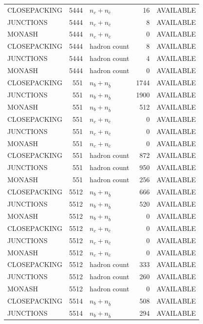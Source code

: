 \begin{landscape}
\begin{longtable}{@{}lrlrl@{}}
CLOSEPACKING & 5444 & $n_c+n_{\bar c}$ & \num{16} & AVAILABLE \\
JUNCTIONS & 5444 & $n_c+n_{\bar c}$ & \num{8} & AVAILABLE \\
MONASH & 5444 & $n_c+n_{\bar c}$ & \num{0} & AVAILABLE \\
CLOSEPACKING & 5444 & hadron count & \num{8} & AVAILABLE \\
JUNCTIONS & 5444 & hadron count & \num{4} & AVAILABLE \\
MONASH & 5444 & hadron count & \num{0} & AVAILABLE \\
CLOSEPACKING & 551 & $n_b+n_{\bar b}$ & \num{1744} & AVAILABLE \\
JUNCTIONS & 551 & $n_b+n_{\bar b}$ & \num{1900} & AVAILABLE \\
MONASH & 551 & $n_b+n_{\bar b}$ & \num{512} & AVAILABLE \\
CLOSEPACKING & 551 & $n_c+n_{\bar c}$ & \num{0} & AVAILABLE \\
JUNCTIONS & 551 & $n_c+n_{\bar c}$ & \num{0} & AVAILABLE \\
MONASH & 551 & $n_c+n_{\bar c}$ & \num{0} & AVAILABLE \\
CLOSEPACKING & 551 & hadron count & \num{872} & AVAILABLE \\
JUNCTIONS & 551 & hadron count & \num{950} & AVAILABLE \\
MONASH & 551 & hadron count & \num{256} & AVAILABLE \\
CLOSEPACKING & 5512 & $n_b+n_{\bar b}$ & \num{666} & AVAILABLE \\
JUNCTIONS & 5512 & $n_b+n_{\bar b}$ & \num{520} & AVAILABLE \\
MONASH & 5512 & $n_b+n_{\bar b}$ & \num{0} & AVAILABLE \\
CLOSEPACKING & 5512 & $n_c+n_{\bar c}$ & \num{0} & AVAILABLE \\
JUNCTIONS & 5512 & $n_c+n_{\bar c}$ & \num{0} & AVAILABLE \\
MONASH & 5512 & $n_c+n_{\bar c}$ & \num{0} & AVAILABLE \\
CLOSEPACKING & 5512 & hadron count & \num{333} & AVAILABLE \\
JUNCTIONS & 5512 & hadron count & \num{260} & AVAILABLE \\
MONASH & 5512 & hadron count & \num{0} & AVAILABLE \\
CLOSEPACKING & 5514 & $n_b+n_{\bar b}$ & \num{508} & AVAILABLE \\
JUNCTIONS & 5514 & $n_b+n_{\bar b}$ & \num{294} & AVAILABLE \\

\end{longtable}
\end{landscape}

